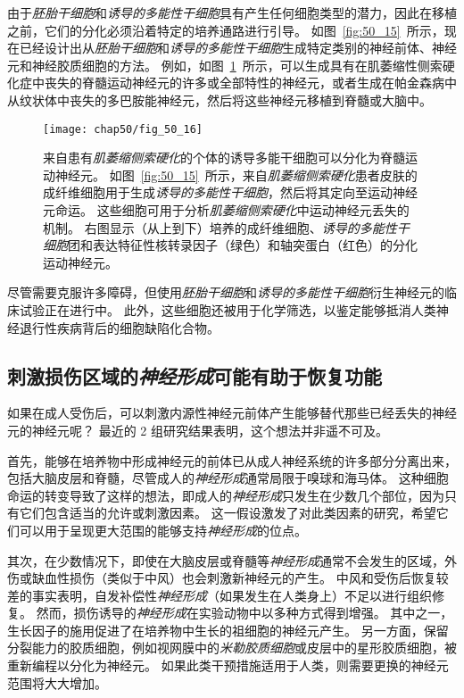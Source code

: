 由于\textit{胚胎干细胞}和\textit{诱导的多能性干细胞}具有产生任何细胞类型的潜力，因此在移植之前，它们的分化必须沿着特定的培养通路进行引导。
如图~\ref{fig:50_15}~所示，现在已经设计出从\textit{胚胎干细胞}和\textit{诱导的多能性干细胞}生成特定类别的神经前体、神经元和神经胶质细胞的方法。
例如，如图~\ref{fig:50_16}~所示，可以生成具有在肌萎缩性侧索硬化症中丧失的脊髓运动神经元的许多或全部特性的神经元，或者生成在帕金森病中从纹状体中丧失的多巴胺能神经元，然后将这些神经元移植到脊髓或大脑中。


\begin{figure}[htbp]
	\centering
	\texttt{[image: chap50/fig\_50\_16]}
	\caption{来自患有\textit{肌萎缩侧索硬化}的个体的诱导多能干细胞可以分化为脊髓运动神经元。
		如图~\ref{fig:50_15}~所示，来自\textit{肌萎缩侧索硬化}患者皮肤的成纤维细胞用于生成\textit{诱导的多能性干细胞}，然后将其定向至运动神经元命运。
		这些细胞可用于分析\textit{肌萎缩侧索硬化}中运动神经元丢失的机制。
		右图显示（从上到下）培养的成纤维细胞、\textit{诱导的多能性干细胞}团和表达特征性核转录因子（绿色）和轴突蛋白（红色）的分化运动神经元。}
	\label{fig:50_16}
\end{figure}


尽管需要克服许多障碍，但使用\textit{胚胎干细胞}和\textit{诱导的多能性干细胞}衍生神经元的临床试验正在进行中。
此外，这些细胞还被用于化学筛选，以鉴定能够抵消人类神经退行性疾病背后的细胞缺陷化合物。



\subsection{刺激损伤区域的\textit{神经形成}可能有助于恢复功能}

如果在成人受伤后，可以刺激内源性神经元前体产生能够替代那些已经丢失的神经元的神经元呢？
最近的 2 组研究结果表明，这个想法并非遥不可及。


首先，能够在培养物中形成神经元的前体已从成人神经系统的许多部分分离出来，包括大脑皮层和脊髓，尽管成人的\textit{神经形成}通常局限于嗅球和海马体。
这种细胞命运的转变导致了这样的想法，即成人的\textit{神经形成}只发生在少数几个部位，因为只有它们包含适当的允许或刺激因素。
这一假设激发了对此类因素的研究，希望它们可以用于呈现更大范围的能够支持\textit{神经形成}的位点。


其次，在少数情况下，即使在大脑皮层或脊髓等\textit{神经形成}通常不会发生的区域，外伤或缺血性损伤（类似于中风）也会刺激新神经元的产生。
中风和受伤后恢复较差的事实表明，自发补偿性\textit{神经形成}（如果发生在人类身上）不足以进行组织修复。
然而，损伤诱导的\textit{神经形成}在实验动物中以多种方式得到增强。
其中之一，生长因子的施用促进了在培养物中生长的祖细胞的神经元产生。
另一方面，保留分裂能力的胶质细胞，例如视网膜中的\textit{米勒胶质细胞}或皮层中的星形胶质细胞，被重新编程以分化为神经元。
如果此类干预措施适用于人类，则需要更换的神经元范围将大大增加。



